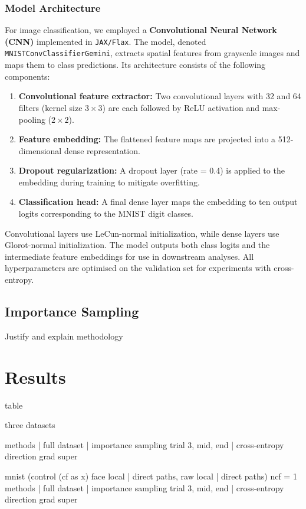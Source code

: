 \documentclass[sigconf,anonymous]{aamas}
\begin{document}
\subsubsection{Model Architecture}
For image classification, we employed a \textbf{Convolutional Neural Network (CNN)} implemented in \texttt{JAX/Flax}. The model, denoted \texttt{MNISTConvClassifierGemini}, extracts spatial features from grayscale images and maps them to class predictions. Its architecture consists of the following components:
\begin{enumerate}
\item \textbf{Convolutional feature extractor:} Two convolutional layers with 32 and 64 filters (kernel size $3 \times 3$) are each followed by ReLU activation and max-pooling ($2 \times 2$).
\item \textbf{Feature embedding:} The flattened feature maps are projected into a 512-dimensional dense representation.
\item \textbf{Dropout regularization:} A dropout layer (rate = 0.4) is applied to the embedding during training to mitigate overfitting.
\item \textbf{Classification head:} A final dense layer maps the embedding to ten output logits corresponding to the MNIST digit classes.
\end{enumerate}
Convolutional layers use LeCun-normal initialization, while dense layers use Glorot-normal initialization. The model outputs both class logits and the intermediate feature embeddings for use in downstream analyses. All hyperparameters are optimised on the validation set for experiments with cross-entropy.

\subsection{Importance Sampling}
Justify and explain methodology

\section{Results}

table 

three datasets

methods | full dataset | importance sampling trial 3, mid, end | 
cross-entropy
direction
grad super

mnist (control (cf as x) face local | direct paths, raw local | direct paths) ncf = 1
methods | full dataset | importance sampling trial 3, mid, end | 
cross-entropy
direction
grad super
\end{document}
